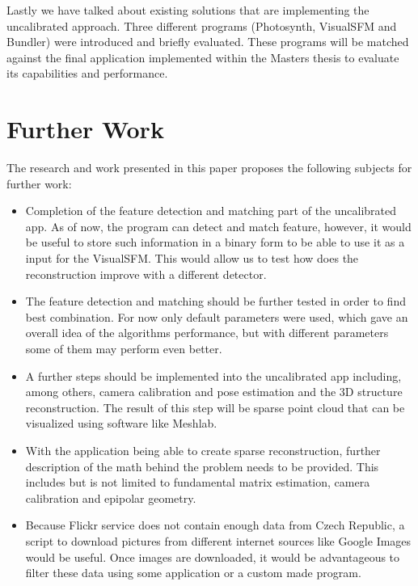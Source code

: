 Lastly we have talked about existing solutions that are implementing the uncalibrated approach. Three different programs (Photosynth, VisualSFM and Bundler) were introduced and briefly evaluated. These programs will be matched against the final application implemented within the Masters thesis to evaluate its capabilities and performance.

\section{Further Work}
The research and work presented in this paper proposes the following subjects for further work:
\begin{itemize}
	\item Completion of the feature detection and matching part of the uncalibrated app. As of now, the program can detect and match feature, however, it would be useful to store such information in a binary form to be able to use it as a input for the VisualSFM. This would allow us to test how does the reconstruction improve with a different detector.
	
	\item The feature detection and matching should be further tested in order to find best combination. For now only default parameters were used, which gave an overall idea of the algorithms performance, but with different parameters some of them may perform even better.
	
	\item A further steps should be implemented into the uncalibrated app including, among others, camera calibration and pose estimation and the 3D structure reconstruction. The result of this step will be sparse point cloud that can be visualized using software like Meshlab.
	
	\item With the application being able to create sparse reconstruction, further description of the math behind the problem needs to be provided. This includes but is not limited to fundamental matrix estimation, camera calibration and epipolar geometry.
	
	\item Because Flickr service does not contain enough data from Czech Republic, a script to download pictures from different internet sources like Google Images would be useful. Once images are downloaded, it would be advantageous to filter these data using some application or a custom made program.
\end{itemize}
